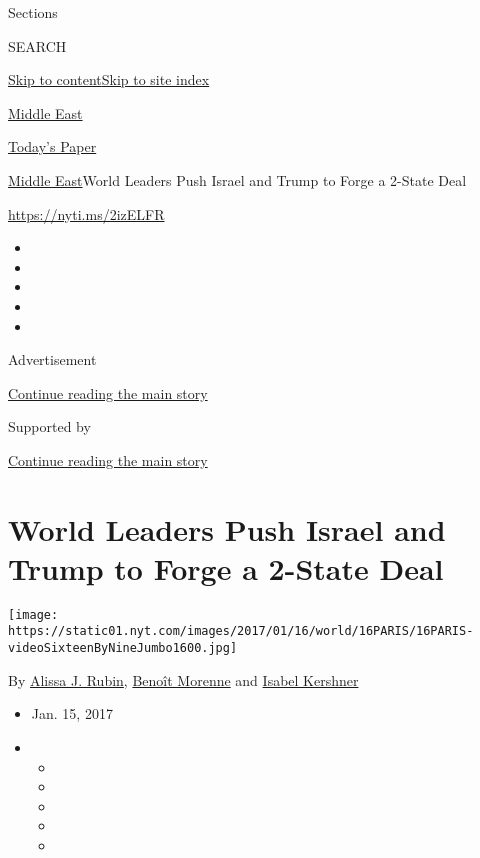 Sections

SEARCH

\protect\hyperlink{site-content}{Skip to
content}\protect\hyperlink{site-index}{Skip to site index}

\href{https://www.nytimes.com/section/world/middleeast}{Middle East}

\href{https://myaccount.nytimes.com/auth/login?response_type=cookie\&client_id=vi}{}

\href{https://www.nytimes.com/section/todayspaper}{Today's Paper}

\href{/section/world/middleeast}{Middle East}\textbar{}World Leaders
Push Israel and Trump to Forge a 2-State Deal

\url{https://nyti.ms/2izELFR}

\begin{itemize}
\item
\item
\item
\item
\item
\end{itemize}

Advertisement

\protect\hyperlink{after-top}{Continue reading the main story}

Supported by

\protect\hyperlink{after-sponsor}{Continue reading the main story}

\hypertarget{world-leaders-push-israel-and-trump-to-forge-a-2-state-deal}{%
\section{World Leaders Push Israel and Trump to Forge a 2-State
Deal}\label{world-leaders-push-israel-and-trump-to-forge-a-2-state-deal}}

\texttt{[image: https://static01.nyt.com/images/2017/01/16/world/16PARIS/16PARIS-videoSixteenByNineJumbo1600.jpg]}

By \href{https://www.nytimes.com/by/alissa-j-rubin}{Alissa J. Rubin},
\href{https://www.nytimes.com/by/benoit-morenne}{Benoît Morenne} and
\href{https://www.nytimes.com/by/isabel-kershner}{Isabel Kershner}

\begin{itemize}
\item
  Jan. 15, 2017
\item
  \begin{itemize}
  \item
  \item
  \item
  \item
  \item
  \end{itemize}
\end{itemize}

